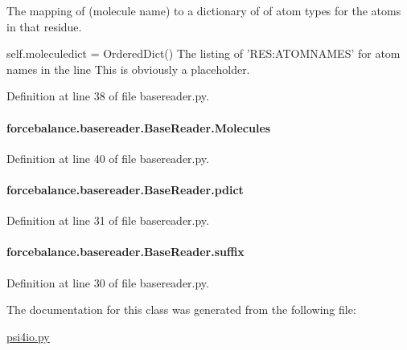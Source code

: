 The mapping of (molecule name) to a dictionary of of atom types for the atoms in that residue. 

self.\-moleculedict = Ordered\-Dict() The listing of 'R\-E\-S\-:A\-T\-O\-M\-N\-A\-M\-E\-S' for atom names in the line This is obviously a placeholder. 

Definition at line 38 of file basereader.\-py.

\hypertarget{classforcebalance_1_1basereader_1_1BaseReader_ad2842550aa690f1cd82e41ec8d6fe541}{
\paragraph[{Molecules}]{\setlength{\rightskip}{0pt plus 5cm}forcebalance.\-basereader.\-Base\-Reader.\-Molecules\hspace{0.3cm}{\ttfamily [inherited]}}}\label{classforcebalance_1_1basereader_1_1BaseReader_ad2842550aa690f1cd82e41ec8d6fe541}


Definition at line 40 of file basereader.\-py.

\hypertarget{classforcebalance_1_1basereader_1_1BaseReader_a1ca75e7775c49f57796fb3ba816486e7}{
\paragraph[{pdict}]{\setlength{\rightskip}{0pt plus 5cm}forcebalance.\-basereader.\-Base\-Reader.\-pdict\hspace{0.3cm}{\ttfamily [inherited]}}}\label{classforcebalance_1_1basereader_1_1BaseReader_a1ca75e7775c49f57796fb3ba816486e7}


Definition at line 31 of file basereader.\-py.

\hypertarget{classforcebalance_1_1basereader_1_1BaseReader_ab2aba0f349b78cb3c1e11c35f56d6bdf}{
\paragraph[{suffix}]{\setlength{\rightskip}{0pt plus 5cm}forcebalance.\-basereader.\-Base\-Reader.\-suffix\hspace{0.3cm}{\ttfamily [inherited]}}}\label{classforcebalance_1_1basereader_1_1BaseReader_ab2aba0f349b78cb3c1e11c35f56d6bdf}


Definition at line 30 of file basereader.\-py.



The documentation for this class was generated from the following file\-:\begin{DoxyCompactItemize}
\item 
\hyperlink{psi4io_8py}{psi4io.\-py}\end{DoxyCompactItemize}
